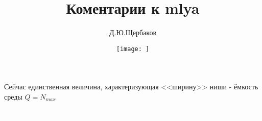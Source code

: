 \documentclass[a4paper,11pt]{book}
\title{Коментарии к mlya}
\author{Д.Ю.Щербаков}
\date{\texttt{[image: ]}}
\newenvironment{csketch}{%
\begin{flushright}
  
\begin{adjustbox}{minipage=.85\linewidth,bgcolor=OliveGreen}
}
{%
\end{adjustbox}
\end{flushright}}
\begin{document}
Сейчас единственная величина, характеризующая <<ширину>> ниши - ёмкость среды $Q=N_{max}$
\begin{csketch}
\textcolor{white}{aaaaa}
\end{csketch}
\end{document}
